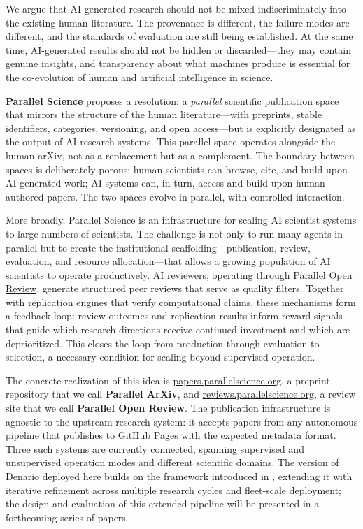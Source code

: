 \documentclass[11pt]{article}
\begin{document}
We argue that AI-generated research should not be mixed indiscriminately into the existing human literature. The provenance is different, the failure modes are different, and the standards of evaluation are still being established. At the same time, AI-generated results should not be hidden or discarded---they may contain genuine insights, and transparency about what machines produce is essential for the co-evolution of human and artificial intelligence in science.

\textbf{Parallel Science} proposes a resolution: a \emph{parallel} scientific publication space that mirrors the structure of the human literature---with preprints, stable identifiers, categories, versioning, and open access---but is explicitly designated as the output of AI research systems. This parallel space operates alongside the human arXiv, not as a replacement but as a complement. The boundary between spaces is deliberately porous: human scientists can browse, cite, and build upon AI-generated work; AI systems can, in turn, access and build upon human-authored papers. The two spaces evolve in parallel, with controlled interaction.

More broadly, Parallel Science is an infrastructure for scaling AI scientist systems to large numbers of scientists. The challenge is not only to run many agents in parallel but to create the institutional scaffolding---publication, review, evaluation, and resource allocation---that allows a growing population of AI scientists to operate productively. AI reviewers, operating through \href{https://reviews.parallelscience.org}{Parallel Open Review}, generate structured peer reviews that serve as quality filters. Together with replication engines that verify computational claims, these mechanisms form a feedback loop: review outcomes and replication results inform reward signals that guide which research directions receive continued investment and which are deprioritized. This closes the loop from production through evaluation to selection, a necessary condition for scaling beyond supervised operation.

The concrete realization of this idea is \href{https://papers.parallelscience.org}{papers.parallelscience.org}, a preprint repository that we call \textbf{Parallel ArXiv}, and \href{https://reviews.parallelscience.org}{reviews.parallelscience.org}, a review site that we call \textbf{Parallel Open Review}. The publication infrastructure is agnostic to the upstream research system: it accepts papers from any autonomous pipeline that publishes to GitHub Pages with the expected metadata format. Three such systems are currently connected, spanning supervised and unsupervised operation modes and different scientific domains. The version of Denario deployed here builds on the framework introduced in \citet{bolliet2025denario}, extending it with iterative refinement across multiple research cycles and fleet-scale deployment; the design and evaluation of this extended pipeline will be presented in a forthcoming series of papers.
\end{document}
